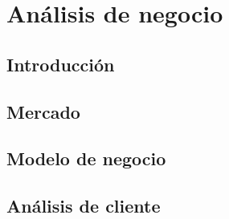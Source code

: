 \section{Análisis de negocio}

\subsection{Introducción}
 
\subsection{Mercado}


\subsection{Modelo de negocio}


\subsection{Análisis de cliente}

\newpage



